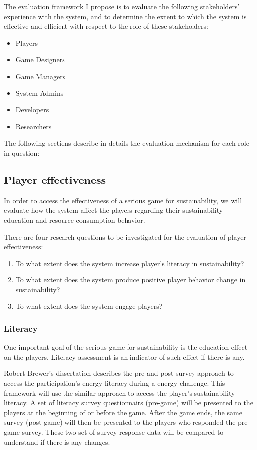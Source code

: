 The evaluation framework I propose is to evaluate the following stakeholders' experience with the system, and to determine the extent to which the system is effective and efficient with respect to the role of these stakeholders:
\begin{itemize}
\item Players
\item Game Designers
 \item Game Managers
\item System Admins
\item Developers
\item Researchers
\end{itemize}

The following sections describe in details the evaluation mechanism for each role in question:

\subsection{Player effectiveness}
In order to access the effectiveness of a serious game for sustainability, we will evaluate how the system affect the players regarding their sustainability education and resource consumption behavior.

There are four research questions to be investigated for the evaluation of player effectiveness:
\begin{enumerate}
\item To what extent does the system increase player's literacy in sustainability?
\item To what extent does the system produce positive player behavior change in sustainability?
\item To what extent does the system engage players?
\end{enumerate}

\subsubsection{Literacy}
One important goal of the serious game for sustainability is the education effect on the players. Literacy assessment is an indicator of such effect if there is any.

Robert Brewer's dissertation describes the pre and post survey approach to access the participation's energy literacy during a energy challenge. This framework will use the similar approach to access the player's sustainability literacy. A set of literacy survey questionnairs (pre-game) will be presented to the players at the beginning of or before the game. After the game ends, the same survey (post-game) will then be presented to the players who responded the pre-game survey. These two set of survey response data will be compared to understand if there is any changes.

